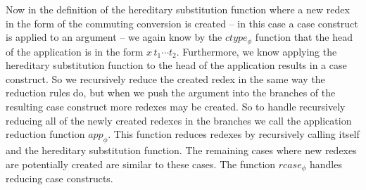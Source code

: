 Now in the definition of the hereditary substitution function where a
new redex in the form of the commuting conversion is created -- in
this case a case construct is applied to an argument -- we again know
by the $ctype_\phi$ function that the head of the application is in
the form $x\,t_1 \cdots t_2$.  Furthermore, we know applying the
hereditary substitution function to the head of the application
results in a case construct.  So we recursively reduce the created
redex in the same way the reduction rules do, but when we push the
argument into the branches of the resulting case construct more
redexes may be created.  So to handle recursively reducing all of the
newly created redexes in the branches we call the application
reduction function $app_\phi$.  This function reduces redexes by
recursively calling itself and the hereditary substitution function.
The remaining cases where new redexes are potentially created are
similar to these cases.  The function $rcase_\phi$ handles reducing 
case constructs.
